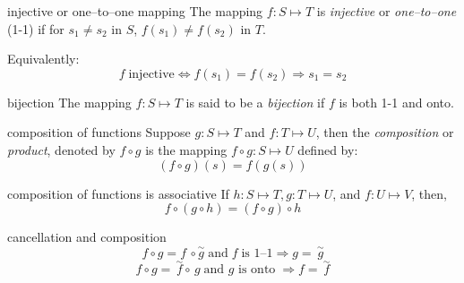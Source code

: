 \documentclass[avery5371,grid]{flashcards}
\begin{document}
\begin{flashcard}[Definition]{injective or one--to--one mapping}
The mapping $f:S \mapsto T$ is \textit{injective} or \textit{one--to--one} 
\mbox{(1-1)} if for $s_1 \neq s_2$ in $S$, $f(s_1) \neq f(s_2)$ in $T$.

\medskip
Equivalently:
\begin{equation*}
f\; \mathrm{ injective } \Longleftrightarrow f(s_1) = f(s_2) \Rightarrow s_1 = s_2
\end{equation*}
\end{flashcard}

\begin{flashcard}[Definition]{bijection}
The mapping $f:S \mapsto T$ is said to be a \textit{bijection} if $f$ is both 
\mbox{1-1} and onto.
\end{flashcard}

\begin{flashcard}[Definition]{composition of functions}
Suppose $g: S \mapsto T$ and $f: T \mapsto U$, then the \textit{composition}
or \textit{product}, denoted by $f\circ g$ is the mapping $f\circ g: S \mapsto U$
defined by:
\begin{equation*}
(f\circ g)(s) = f(g(s))
\end{equation*}
\end{flashcard}


\begin{flashcard}[Lemma]{composition of functions is associative}
If $h: S \mapsto T, g:T \mapsto U$, and $f: U \mapsto V$, then,
\begin{equation*}
f\circ(g\circ h) = (f\circ g)\circ h
\end{equation*}
\end{flashcard}

\begin{flashcard}[Lemma]{cancellation and composition}
\begin{equation*}
f \circ g = f \,\circ \stackrel{\sim}{g} \; \textrm{and} \; f\;\textrm{is 1--1}
\Rightarrow g = \,\stackrel{\sim}{g}
\end{equation*}
\begin{equation*}
f \circ g = \,\stackrel{\sim}{f} \circ\, g\; \textrm{and $g$ is onto} \;
\Rightarrow f = \,\stackrel{\sim}{f}
\end{equation*}
\end{flashcard}
\end{document}
